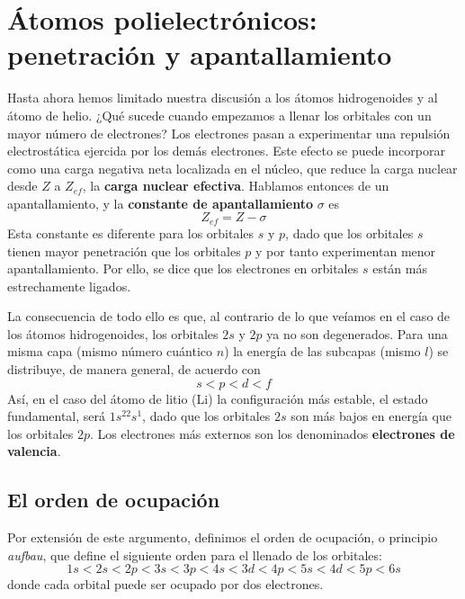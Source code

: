 \documentclass{tufte-handout}
\begin{document}
\section{Átomos polielectrónicos: penetración y apantallamiento}
Hasta ahora hemos limitado nuestra discusión a los átomos
hidrogenoides y al átomo de helio. ¿Qué sucede cuando
empezamos a llenar los orbitales con un mayor número de
electrones? Los electrones pasan a experimentar una
repulsión electrostática ejercida por los demás electrones. 
Este efecto se puede incorporar como una carga negativa neta 
localizada en el núcleo, que reduce la carga nuclear desde $Z$ 
a $Z_{ef}$, la \textbf{carga nuclear efectiva}.
Hablamos entonces de un apantallamiento, y la \textbf{constante de apantallamiento}
$\sigma$ es 
\begin{equation}
    Z_{ef}= Z-\sigma
\end{equation}
Esta constante es diferente para los orbitales $s$ y $p$, 
dado que los orbitales $s$ tienen mayor penetración que los 
orbitales $p$ y por tanto experimentan menor apantallamiento. 
Por ello, se dice que los electrones en orbitales $s$ están 
más estrechamente ligados. 

La consecuencia de todo ello es que,
al contrario de lo que veíamos en el caso de los átomos hidrogenoides, los orbitales $2s$ y $2p$ ya no son degenerados.
Para una misma capa (mismo número cuántico $n$) la energía de las 
subcapas (mismo $l$) se distribuye, de manera general, de acuerdo con
\begin{equation*}
    s<p<d<f
\end{equation*}
Así, en el caso del átomo de litio (Li) la configuración más
estable, el estado fundamental, será $1s^22s^1$, dado que los
orbitales $2s$ son más bajos en energía que los orbitales $2p$.
Los electrones más externos son los denominados \textbf{electrones 
de valencia}.

\subsection{El orden de ocupación}
Por extensión de este argumento, definimos el orden de ocupación,
o principio \textit{aufbau}, que define el siguiente orden para el 
llenado de los orbitales:
\begin{equation*}
    1s < 2s < 2p < 3s<  3p <4s < 3d < 4p < 5s < 4d < 5p < 6s
\end{equation*}
donde cada orbital puede ser ocupado por dos electrones.
\end{document}
